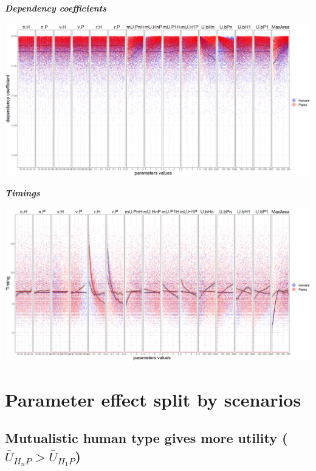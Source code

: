 \documentclass[
]{book}
\begin{document}
\textbf{\emph{Dependency coefficients}}

\includegraphics[width=1\linewidth]{plots/5_multiplePar-depend-ggplot}

\textbf{\emph{Timings}}

\includegraphics[width=1\linewidth]{plots/5_multiplePar-timing-ggplot}

\newpage

\hypertarget{parameter-effect-split-by-scenarios}{%
\section{Parameter effect split by scenarios}\label{parameter-effect-split-by-scenarios}}

\hypertarget{mutualistic-human-type-gives-more-utility-baru_h_np-baru_h_1p}{%
\subsection{\texorpdfstring{Mutualistic human type gives more utility (\(\bar{U}_{H_{n}P}> \bar{U}_{H_{1}P}\))}{Mutualistic human type gives more utility (\textbackslash bar\{U\}\_\{H\_\{n\}P\}\textgreater{} \textbackslash bar\{U\}\_\{H\_\{1\}P\})}}\label{mutualistic-human-type-gives-more-utility-baru_h_np-baru_h_1p}}
\end{document}
